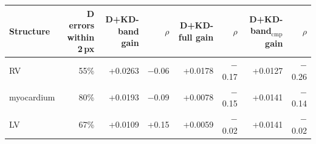 \begin{tabular}{@{}lrrrrrrr@{}}
\toprule
Structure & D errors within 2\,px & D+KD-band gain & $\rho$ & D+KD-full gain & $\rho$ & D+KD-band$_{\mathrm{cmp}}$ gain & $\rho$ \\
\midrule
RV & 55\% & +0.0263 & $-$0.06 & +0.0178 & $-$0.17 & +0.0127 & $-$0.26 \\
myocardium & 80\% & +0.0193 & $-$0.09 & +0.0078 & $-$0.15 & +0.0141 & $-$0.14 \\
LV & 67\% & +0.0109 & +0.15 & +0.0059 & $-$0.02 & +0.0141 & $-$0.02 \\
\bottomrule
\end{tabular}
